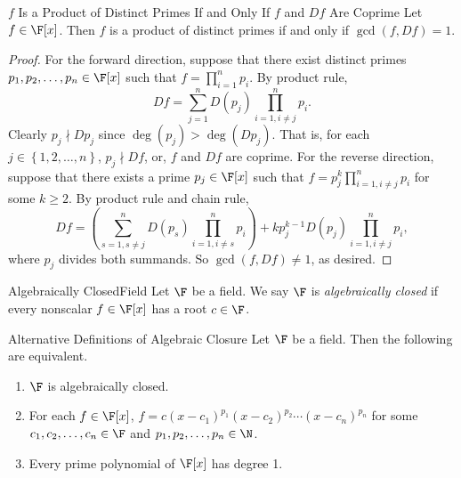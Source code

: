 \documentclass[math_245.tex]{subfiles}
\begin{document}
    \begin{prop}{$f$ Is a Product of Distinct Primes If and Only If $f$ and $Df$ Are Coprime}
        Let $f\in \F[x]$. Then $f$ is a product of distinct primes if and only if $\gcd(f, Df) = 1$.
    \end{prop}

    \begin{proof}
        For the forward direction, suppose that there exist distinct primes $p_1, p_2, \ldots, p_n\in \F[x]$ such that $f = \prod^{n}_{i=1} p_i$. By product rule,
        \begin{equation*}
            Df = \sum^{n}_{j=1} D(p_j) \prod^{n}_{i=1, i\neq j} p_i. 
        \end{equation*}
        Clearly $p_j\nmid Dp_j$ since $\deg(p_j) > \deg(Dp_j)$. That is, for each $j\in \left\lbrace 1, 2, \ldots, n \right\rbrace$, $p_j\nmid Df$, or, $f$ and $Df$ are coprime. For the reverse direction, suppose that there exists a prime $p_j\in \F[x]$ such that $f = p_j^k \prod^{n}_{i=1, i\neq j} p_i$ for some $k\geq 2$. By product rule and chain rule,
        \begin{equation*}
            Df = \left( \sum^{n}_{s=1, s\neq j} D(p_s) \prod^{n}_{i=1, i\neq s} p_i  \right) + kp_j^{k-1} D(p_j) \prod^{n}_{i=1, i\neq j} p_i, 
        \end{equation*}
        where $p_j$ divides both summands. So $\gcd(f, Df)\neq 1$, as desired.
    \end{proof}

    \begin{definition}{Algebraically Closed}{Field}
        Let $\F$ be a field. We say $\F$ is \emph{algebraically closed} if every nonscalar $f\in \F[x]$ has a root $c\in \F$.
    \end{definition}

    \begin{prop}{Alternative Definitions of Algebraic Closure}
        Let $\F$ be a field. Then the following are equivalent.
        \begin{enumerate}
            \item $\F$ is algebraically closed.
            \item For each $f\in \F[x]$, $f = c(x-c_1)^{p_1} (x-c_2)^{p_2} \cdots (x-c_n)^{p_n}$ for some $c_1, c_2, \ldots, c_n\in \F$ and $p_1, p_2, \ldots, p_n\in \N$.
            \item Every prime polynomial of $\F[x]$ has degree 1.
        \end{enumerate}
    \end{prop}
\end{document}
